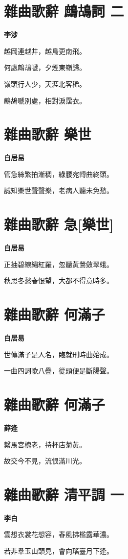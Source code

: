 \documentclass[12pt,a4paper]{ctexbook}
\begin{document}
\section{雜曲歌辭 鷓鴣詞 二}
\textbf{李涉}\par\vspace{0.5em}
越岡連越井，越鳥更南飛。\par
何處鷓鴣嗁，夕煙東嶺歸。\par
嶺頭行人少，天涯北客稀。\par
鷓鴣嗁別處，相對淚霑衣。\par

\section{雜曲歌辭 樂世}
\textbf{白居易}\par\vspace{0.5em}
管急絲繁拍漸稠，綠腰宛轉曲終頭。\par
誠知樂世聲聲樂，老病人聽未免愁。\par

\section{雜曲歌辭 急[樂世]}
\textbf{白居易}\par\vspace{0.5em}
正抽碧線繡紅羅，忽聽黃鶯斂翠蛾。\par
秋思冬愁春恨望，大都不得意時多。\par

\section{雜曲歌辭 何滿子}
\textbf{白居易}\par\vspace{0.5em}
世傳滿子是人名，臨就刑時曲始成。\par
一曲四詞歌八疊，從頭便是斷腸聲。\par

\section{雜曲歌辭 何滿子}
\textbf{薛逢}\par\vspace{0.5em}
繫馬宮槐老，持杯店菊黃。\par
故交今不見，流恨滿川光。\par

\section{雜曲歌辭 清平調 一}
\textbf{李白}\par\vspace{0.5em}
雲想衣裳花想容，春風拂檻露華濃。\par
若非羣玉山頭見，會向瑤臺月下逢。\par
\end{document}

